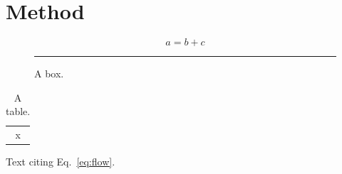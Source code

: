 \documentclass{article}
\begin{document}
\section{Method}\label{sec:method}
\begin{equation}\label{eq:flow} a = b + c \end{equation}
\begin{figure}[h]\centering\rule{2cm}{1cm}\caption{A box.}\label{fig:box}\end{figure}
\begin{table}[h]\centering\begin{tabular}{c}x\end{tabular}\caption{A table.}\label{tab:t}\end{table}
Text citing Eq.~\eqref{eq:flow}.
\end{document}

